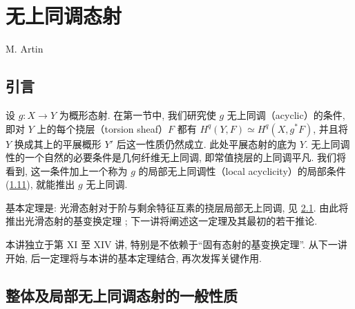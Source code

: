 \chapter{无上同调态射}
\begin{center}
M. Artin
\end{center}
\label{sga4.exp.XV}

\setcounter{pageoriginal}{167}


\section*{引言}\pageoriginale

设 $g:X\rightarrow Y$ 为概形态射. 在第一节中, 我们研究使 $g$ 无上同调（acyclic）的条件, 即对 $Y$ 上的每个挠层（torsion sheaf）$F$ 都有
$H^{q}(Y,F)\simeq H^{q}(X,g^{\ast}F)$, 并且将 $Y$ 换成其上的平展概形 $Y'$ 后这一性质仍然成立. 此处平展态射的底为 $Y$. 无上同调性的一个自然的必要条件是几何纤维无上同调, 即常值挠层的上同调平凡. 我们将看到, 这一条件加上一个称为 $g$ 的局部无上同调性（local acyclicity）的局部条件 (\hyperref[XV.def1.11]{1.11}), 就能推出 $g$ 无上同调.

基本定理是: 光滑态射对于阶与剩余特征互素的挠层局部无上同调, 见 \hyperref[XV.thm2.1]{2.1}. 由此将推出光滑态射的基变换定理 ; 下一讲将阐述这一定理及其最初的若干推论.

本讲独立于第 XI 至 XIV 讲, 特别是不依赖于“固有态射的基变换定理”. 从下一讲开始, 后一定理将与本讲的基本定理结合, 再次发挥关键作用.

\section{整体及局部无上同调态射的一般性质}\pageoriginale


